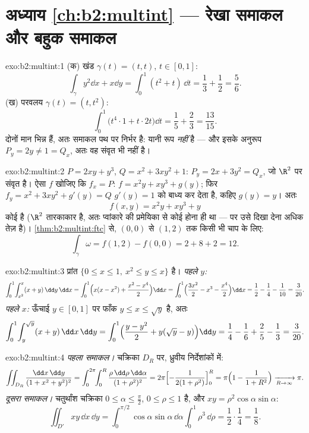 \section*{अध्याय \ref{ch:b2:multint} --- रेखा समाकल और बहुक समाकल}

\begin{solution}{exo:b2:multint:1}
(क) खंड $\gamma(t) = (t, t)$, $t \in [0,1]$:
\[
\int_\gamma y^2\dd x + x\dd y
= \int_0^1 (t^2 + t)\,\dd t = \frac13 + \frac12 = \frac56 .
\]
(ख) परवलय $\gamma(t) = (t, t^2)$:
\[
\int_0^1 \bigl(t^4\cdot 1 + t\cdot 2t\bigr)\dd t
= \frac15 + \frac23 = \frac{13}{15} .
\]
दोनों मान भिन्न हैं, अतः समाकल पथ पर निर्भर है: यानी रूप 
\emph{नहीं} है --- और इसके अनुरूप $P_y = 2y \neq 1 = Q_x$, अतः वह संवृत भी नहीं है।
\end{solution}

\begin{solution}{exo:b2:multint:2}
$P = 2xy + y^3$, $Q = x^2 + 3xy^2 + 1$: $P_y = 2x + 3y^2 = Q_x$, जो $\R^2$ पर संवृत है। ऐसा $f$ खोजिए कि $f_x = P$: $f = x^2y + xy^3
+ g(y)$;
फिर $f_y = x^2 + 3xy^2 + g'(y) = Q$ $g'(y) = 1$ को बाध्य कर देता है, कहिए $g(y) = y$। अतः
\[
f(x, y) = x^2y + xy^3 + y
\]
कोई  है ($\R^2$ तारकाकार है, अतः प्वांकारे की प्रमेयिका से कोई
 होना ही था --- पर उसे दिखा देना अधिक तेज़ है)। \cref{thm:b2:multint:ftc} से, $(0,0)$
से $(1,2)$ तक किसी भी चाप के लिए:
\[
\int_\gamma\omega = f(1, 2) - f(0, 0) = 2 + 8 + 2 = 12 .
\]
\end{solution}

\begin{solution}{exo:b2:multint:3}
प्रांत $\{0 \leq x \leq 1,\ x^2 \leq y \leq x\}$ है। \emph{पहले $y$:}
\[
\int_0^1\!\int_{x^2}^{x}(x + y)\,\dd y\,\dd x
= \int_0^1\Bigl(x(x - x^2)
+ \frac{x^2 - x^4}{2}\Bigr)\dd x
= \int_0^1\Bigl(\frac{3x^2}{2} - x^3 - \frac{x^4}{2}\Bigr)\dd x
= \frac12 - \frac14 - \frac1{10} = \frac{3}{20} .
\]
\emph{पहले $x$:} ऊँचाई $y \in [0, 1]$ पर फाँक $y \leq x \leq
\sqrt y$ है, अतः
\[
\int_0^1\!\int_{y}^{\sqrt y}(x + y)\,\dd x\,\dd y
= \int_0^1\Bigl(\frac{y - y^2}{2}
+ y(\sqrt y - y)\Bigr)\dd y
= \frac14 - \frac16 + \frac25 - \frac13 = \frac{3}{20} .
\]
\end{solution}

\begin{solution}{exo:b2:multint:4}
\emph{पहला समाकल।} चक्रिका $D_R$ पर, ध्रुवीय निर्देशांकों में:
\[
\iint_{D_R}\frac{\dd x\,\dd y}{(1 + x^2 + y^2)^2}
= \int_0^{2\pi}\!\!\int_0^R
\frac{\rho\,\dd\rho\,\dd\alpha}{(1 + \rho^2)^2}
= 2\pi\Bigl[-\frac{1}{2(1 + \rho^2)}\Bigr]_0^R
= \pi\Bigl(1 - \frac{1}{1 + R^2}\Bigr)
\xrightarrow[R \to \infty]{} \pi .
\]
\emph{दूसरा समाकल।} चतुर्थांश चक्रिका $0 \leq \alpha \leq
\frac\pi2$, $0 \leq \rho \leq 1$ है, और $xy =
\rho^2\cos\alpha\sin\alpha$:
\[
\iint_{D'}xy\,\dd x\,\dd y
= \int_0^{\pi/2}\!\!\cos\alpha\sin\alpha\,\dd\alpha
\int_0^1 \rho^3\,\dd\rho
= \frac12\cdot\frac14 = \frac18 .
\]
\end{solution}

